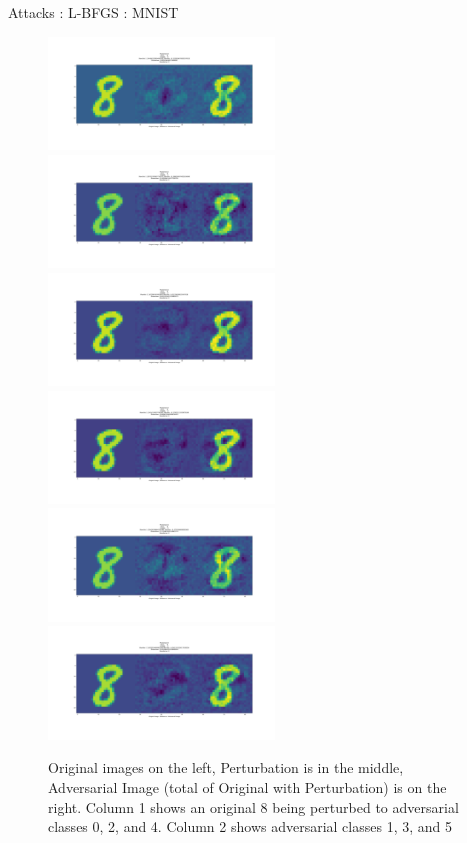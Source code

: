 \begin{frame}{Attacks : L-BFGS : MNIST}
    \begin{figure}[H]
\label{lbfgsa}
\includegraphics[trim=200 185 100 200, clip, width=6cm]{2019-04-10-adverse/mnist_examples/FC200-200-10-2448-O8-A0-attack_summary.png}\includegraphics[trim=200 185 100 200, clip,width=6cm]{2019-04-10-adverse/mnist_examples/FC200-200-10-2448-O8-A1-attack_summary.png}
\includegraphics[trim=200 185 100 200, clip,width=6cm]{2019-04-10-adverse/mnist_examples/FC200-200-10-2448-O8-A2-attack_summary.png}\includegraphics[trim=200 185 100 200, clip,width=6cm]{2019-04-10-adverse/mnist_examples/FC200-200-10-2448-O8-A3-attack_summary.png}
\includegraphics[trim=200 185 100 200, clip,width=6cm]{2019-04-10-adverse/mnist_examples/FC200-200-10-2448-O8-A4-attack_summary.png}\includegraphics[trim=200 185 100 200, clip,width=6cm]{2019-04-10-adverse/mnist_examples/FC200-200-10-2448-O8-A5-attack_summary.png}
\caption{Original images on the left, Perturbation is in the middle, Adversarial Image (total of Original with Perturbation) is on the right. Column 1 shows an original 8 being perturbed to adversarial classes 0, 2, and 4. Column 2 shows adversarial classes 1, 3, and 5}
\end{figure}
\end{frame}
